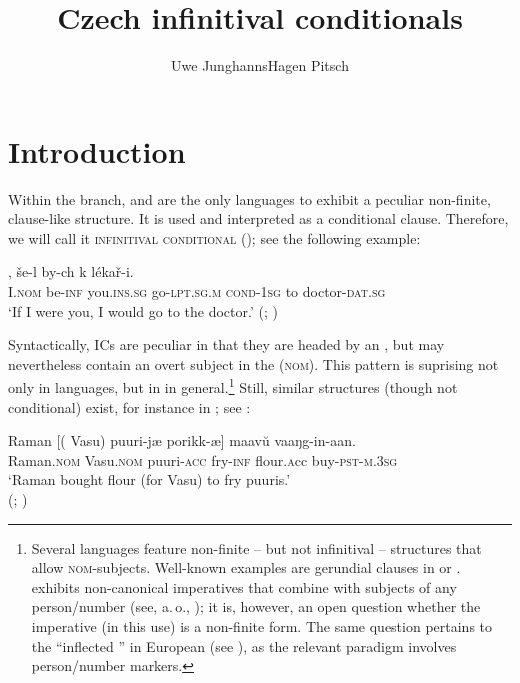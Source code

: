 \documentclass[output=paper,colorlinks,citecolor=brown,newtxmath]{langsci/langscibook}
\title{Czech infinitival conditionals}
\author{Uwe Junghanns\affiliation{University of Göttingen}\lastand Hagen Pitsch\affiliation{University of Göttingen}}
\begin{document}
\maketitle

\section{Introduction}

Within the  branch,  and  are the only languages to exhibit a peculiar non-finite, clause-like structure. It is used and interpreted as a conditional clause. Therefore, we will call it \textsc{infinitival conditional} (); see the following example:

\ea\label{ex:start}
, še-l by-ch k lékař-i.\\
     {} I.\textsc{nom} be-\textsc{inf} you.\textsc{ins.sg} go-\textsc{lpt.sg.m} \textsc{cond-1sg} to doctor-\textsc{dat.sg}\\
\glt `If I were you, I would go to the doctor.' \hfill (; \citealt[683]{Travnicek1951})
\z

\noindent Syntactically, ICs are peculiar in that they are headed by an , but may nevertheless contain an overt subject in the  (\textsc{nom}). This pattern is suprising not only in  languages, but in  in general.\footnote{Several  languages feature non-finite -- but not infinitival -- structures that allow \textsc{nom}-subjects. Well-known examples are gerundial clauses in  or .  exhibits non-canonical imperatives that combine with subjects of any person/number (see, a.\,o., \citealt{Xrakovskij2009}); it is, however, an open question whether the imperative (in this use) is a non-finite form. The same question pertains to the ``inflected '' in European  (see \citealt{Raposo1987}), as the relevant paradigm involves person/number markers.} Still, similar structures (though not conditional) exist, for instance in ; see :

\ea\label{ex:Tamil}
\gll Raman {[(}\hspace{-2pt} Vasu) {puuri-jæ} {porikk-æ}] maav\u{u} vaaŋg-in-aan.\\
	Raman.\textsc{nom} {} Vasu.\textsc{nom} puuri-\textsc{acc} fry-\textsc{inf} flour.{\textsc acc} buy-\textsc{pst-m.3sg}\\
\glt `Raman bought flour (for Vasu) to fry puuris.' \\ \hfill (; \citealt[467]{McFaddenSundaresan2018})
\z
\end{document}
